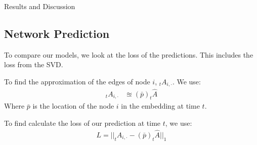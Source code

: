 \documentclass[12pt]{amsart}
\begin{document}


\begin{section}{Results and Discussion}
    \subsection{Network Prediction}
    To compare our models, we look at the loss of the predictions. This includes the loss from the SVD.
    
    To find the approximation of the edges of node $i$, $_tA_{i,\cdot}$. We use: 
    \begin{align}
        _tA_{i,\cdot} &\approxeq (\bar p) _t\hat A
    \end{align}
    Where $\bar p$ is the location of the node $i$ in the embedding at time $t$.

    To find calculate the loss of our prediction at time $t$, we use:
    \begin{align}
        L = ||_tA_{i,\cdot} - (\bar p) _t\hat A||_1
    \end{align}
    

\end{section}
\end{document}
